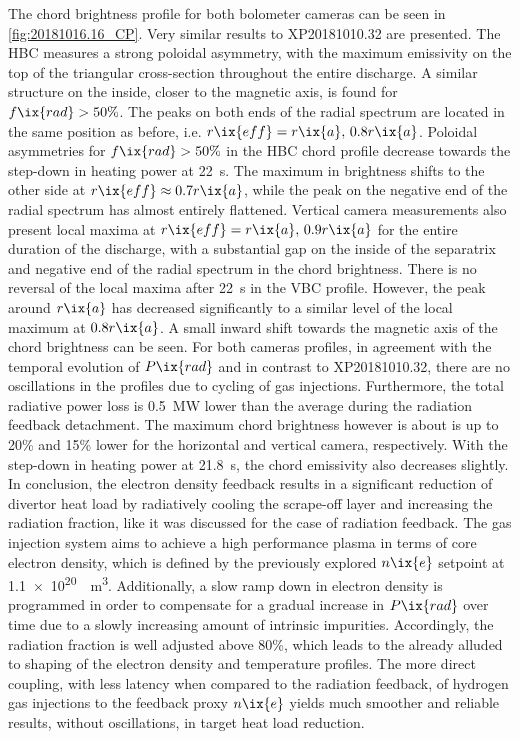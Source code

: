 %
                The chord brightness profile for both bolometer cameras can be seen in \cref{fig:20181016.16_CP}. Very similar results to  XP20181010.32 are presented. The HBC measures a strong poloidal asymmetry, with the maximum emissivity on the top of the triangular cross-section throughout the entire discharge. A similar structure on the inside, closer to the magnetic axis, is found for $f\ix{rad}>50\%$. The peaks on both ends of the radial spectrum are located in the same position as before, i.e. $r\ix{eff}=r\ix{a},\,0.8r\ix{a}$. Poloidal asymmetries for $f\ix{rad}>50\%$ in the HBC chord profile decrease towards the step-down in heating power at \SI{22}{\second}. The maximum in brightness shifts to the other side at $r\ix{eff}\approx0.7r\ix{a}$, while the peak on the negative end of the radial spectrum has almost entirely flattened. Vertical camera measurements also present local maxima at $r\ix{eff}=\-r\ix{a},\,0.9r\ix{a}$ for the entire duration of the discharge, with a substantial gap on the inside of the separatrix and negative end of the radial spectrum in the chord brightness. There is no reversal of the local maxima after \SI{22}{\second} in the VBC profile. However, the peak around $\-r\ix{a}$ has decreased significantly to a similar level of the local maximum at $0.8r\ix{a}$. A small inward shift towards the magnetic axis of the chord brightness can be seen. For both cameras profiles, in agreement with the temporal evolution of $P\ix{rad}$ and in contrast to XP20181010.32, there are no oscillations in the profiles due to cycling of gas injections. Furthermore, the total radiative power loss is \SI{0.5}{\mega\watt} lower than the average during the radiation feedback detachment. The maximum chord brightness however is about is up to 20\% and 15\% lower for the horizontal and vertical camera, respectively. With the step-down in heating power at \SI{21.8}{\second}, the chord emissivity also decreases slightly.\\%
                In conclusion, the electron density feedback results in a significant reduction of divertor heat load by radiatively cooling the scrape-off layer and increasing the radiation fraction, like it was discussed for the case of radiation feedback. The gas injection system aims to achieve a high performance plasma in terms of core electron density, which is defined by the previously explored $n\ix{e}$ setpoint at \SI{1.1e20}{\per\cubic\meter}. Additionally, a slow ramp down in electron density is programmed in order to compensate for a gradual increase in $P\ix{rad}$ over time due to a slowly increasing amount of intrinsic impurities. Accordingly, the radiation fraction is well adjusted above 80\%, which leads to the already alluded to shaping of the electron density and temperature profiles. The more direct coupling, with less latency when compared to the radiation feedback, of hydrogen gas injections to the feedback proxy $n\ix{e}$ yields much smoother and reliable results, without oscillations, in target heat load reduction.%
%
